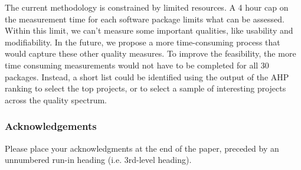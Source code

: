 \documentclass[runningheads]{llncs}
\begin{document}
The current methodology is constrained by limited resources.  A 4 hour cap on
the measurement time for each software package limits what can be assessed.
Within this limit, we can't measure some important qualities, like usability and
modifiability.  In the future, we propose a more time-consuming process that
would capture these other quality measures.  To improve the feasibility, the
more time consuming measurements would not have to be completed for all 30
packages. Instead, a short list could be identified using the output of the AHP
ranking to select the top projects, or to select a sample of interesting
projects across the quality spectrum.

\subsubsection{Acknowledgements} Please place your acknowledgments at
the end of the paper, preceded by an unnumbered run-in heading (i.e.
3rd-level heading).

%
%
%


%




\end{document}

